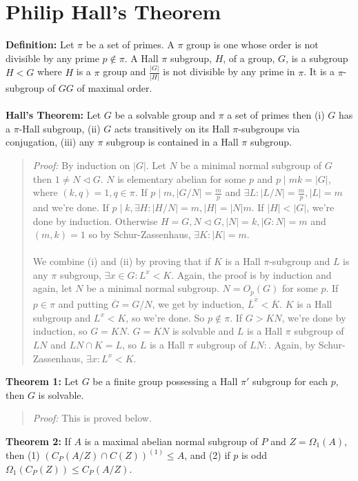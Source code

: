 \section {Philip Hall's Theorem} 
{\bf Definition:} Let $\pi$ be a set of primes. A $\pi$ group is one whose order is not divisible by any prime $p \notin \pi$.
A Hall $\pi$ subgroup, $H$, of a group, $G$, is a subgroup $H<G$ where $H$ is a $\pi$ group and ${\frac {|G|} {|H|}}$ is not divisible by any
prime in $\pi$.  It is a $\pi$-subgroup of $GG$ of maximal order.
\\
\\
{\bf Hall's Theorem:} 
Let $G$ be a solvable group and $\pi$ a set of primes then (i) $G$ has a $\pi$-Hall
subgroup, (ii) $G$ acts transitively on its Hall $\pi$-subgroups via conjugation, 
(iii) any $\pi$ subgroup is contained in a Hall $\pi$ subgroup.
\begin{quote}
\emph{Proof:} By induction on $|G|$.  Let $N$ be a minimal normal subgroup of $G$ then
$1 \ne N \lhd G$.  $N$ is elementary abelian for some $p$ and $p \mid mk= |G|$, where
$(k,q)=1, q \in \pi$.   If
$p \mid m, |G/N|= {\frac m p}$ and $\exists L: |L/N|= {\frac m p}, |L|= m$ and we're done.
If $p \mid k, \exists H: |H/N|=m, |H|= |N|m$.  If $|H| < |G|$, we're done by induction.
Otherwise $H=G, N \lhd G, |N|= k, |G:N|=m$ and $(m,k)=1$ so by Schur-Zassenhaus,
$\exists K: |K|=m$.
\\
\\
We combine (i) and (ii) by proving that if $K$ is a Hall $\pi$-subgroup and $L$ is any $\pi$ subgroup,
$\exists x \in G: L^x < K$.  Again, the proof is by induction and again, let $N$ be a minimal normal subgroup.
$N= O_p(G)$ for some $p$.  If $p \in \pi$ and putting ${\overline G} = G / N$, we get by induction,
${\overline L}^{\overline x} < {\overline K}$.  $K$ is a Hall subgroup and $L^x <K$, so we're done. So
$p \notin \pi$.  If $G > KN$, we're done by induction, so $G=KN$.  $G= KN$ is solvable and $L$ is a
Hall $\pi$ subgroup of $LN$ and $LN \cap K = L$, so $L$ is a Hall $\pi$ subgroup of $LN:$.  Again,
by Schur-Zassenhaus, $\exists x: L^x < K$.
\end{quote}
{\bf Theorem 1: } Let $G$ be a finite group possessing a Hall $\pi'$ subgroup for each $p$, then $G$ 
is solvable. 
\begin{quote}
\emph{Proof:}  
This is proved below.
\end{quote}
{\bf Theorem 2:}
If $A$ is a maximal abelian normal subgroup of $P$ and $Z=\Omega_1(A)$, then
(1) $(C_P(A/Z) \cap C(Z))^{(1)} \le A$, and (2) if $p$ is odd $\Omega_1(C_P(Z)) \le C_P(A/Z)$.
